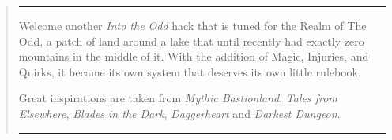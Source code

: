 \begin{abstract}
\hrule \vspace{2mm}
\begin{center}
 Welcome another \emph{Into the Odd} hack that is tuned for the Realm of The Odd, a patch of land around a lake that until recently had exactly zero mountains in the middle of it. With the addition of Magic, Injuries, and Quirks, it became its own system
 that deserves its own little rulebook.

Great inspirations are taken from \emph{Mythic Bastionland}, \emph{Tales from Elsewhere}, \emph{Blades in the Dark}, \emph{Daggerheart} and \emph{Darkest Dungeon}.
\end{center}
\vspace{2mm} \hrule
\end{abstract}